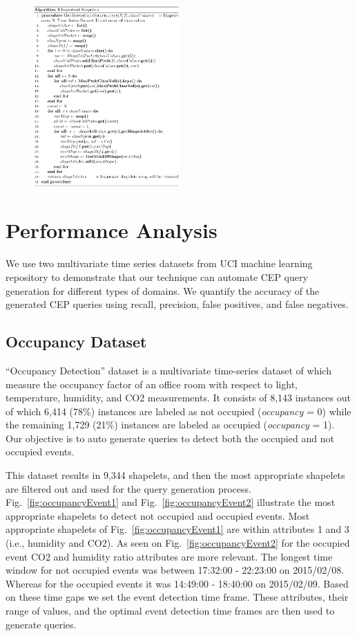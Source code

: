 \documentclass[conference]{IEEEtran}  %
\begin{document}
\begin{figure}
\includegraphics[width=0.5\textwidth]{algo3.png}\squeezeup\squeezeup\squeezeup
\end{figure}

\section{Performance Analysis}
We use two multivariate time series datasets from UCI machine learning repository \cite{IEEEexample:Ocupancy,IEEEexample:EEG} to demonstrate that our technique can automate CEP query generation for different types of domains. We quantify the accuracy of the generated CEP queries using recall, precision, false positives, and false negatives. 

\subsection{Occupancy Dataset} 
“Occupancy Detection” dataset \cite{IEEEexample:Ocupancy} is a multivariate time-series dataset of which measure the occupancy factor of an office room with respect to light, temperature, humidity, and CO2 measurements. It consists of 8,143 instances out of which 6,414 (78\%) instances are labeled as not occupied (\textit{occupancy} = 0) while the remaining 1,729 (21\%) instances are labeled as occupied (\textit{occupancy} = 1). Our objective is to auto generate queries to detect both the occupied and not occupied events.

This dataset results in 9,344 shapelets, and then the most appropriate shapelets are filtered out and used for the query generation process. Fig.~\ref{fig:occupancyEvent1} and Fig.~\ref{fig:occupancyEvent2} illustrate the most appropriate shapelets to detect not occupied and occupied events. Most appropriate shapelets of Fig.~\ref{fig:occupancyEvent1} are within attributes 1 and 3 (i.e., humidity and CO2). As seen on Fig.~\ref{fig:occupancyEvent2} for the occupied event CO2 and humidity ratio attributes are more relevant. The longest time window for not occupied events was between 17:32:00 - 22:23:00 on 2015/02/08. Whereas for the occupied events it was 14:49:00 - 18:40:00 on 2015/02/09. Based on these time gaps we set the event detection time frame. These attributes, their range of values, and the optimal event detection time frames are then used to generate queries.
\end{document}
